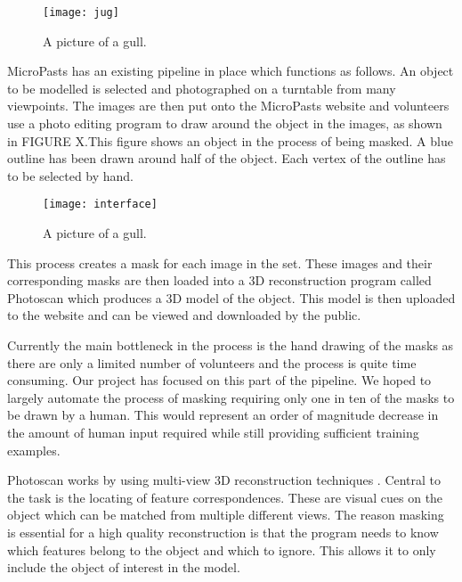 \documentclass[12pt]{IIBproject}
\begin{document}
\begin{figure}[H]
  \caption{A picture of a gull.}
  \centering
    \texttt{[image: jug]}
\end{figure}

 MicroPasts has an existing pipeline in place which functions as follows. An object to be modelled is selected and photographed on a turntable from many viewpoints. The images are then put onto the MicroPasts website and volunteers use a photo editing program to draw around the object in the images, as shown in FIGURE X.This figure shows an object in the process of being masked. A blue outline has been drawn around half of the object. Each vertex of the outline has to be selected by hand.
\begin{figure}[H]
  \caption{A picture of a gull.}
  \centering
    \texttt{[image: interface]}
\end{figure} 
  This process creates a mask for each image in the set. These images and their corresponding masks are then loaded into a 3D reconstruction program called Photoscan\cite{photoscan} which produces a 3D model of the object. This model is then uploaded to the website and can be viewed and downloaded by the public. 

Currently the main bottleneck in the process is the hand drawing of the masks as there are only a limited number of volunteers and the process is quite time consuming. Our project has focused on this part of the pipeline. We hoped to largely automate the process of masking requiring only one in ten of the masks to be drawn by a human. This would represent an order of magnitude decrease in the amount of human input required while still providing sufficient training examples. 

Photoscan works by using multi-view 3D reconstruction techniques \cite{Hartley2004}. Central to the task is the locating of feature correspondences. These are visual cues on the object which can be matched from multiple different views. The reason masking is essential for a high quality reconstruction is that the program needs to know which features belong to the object and which to ignore. This allows it to only include the object of interest in the model.
\end{document}
